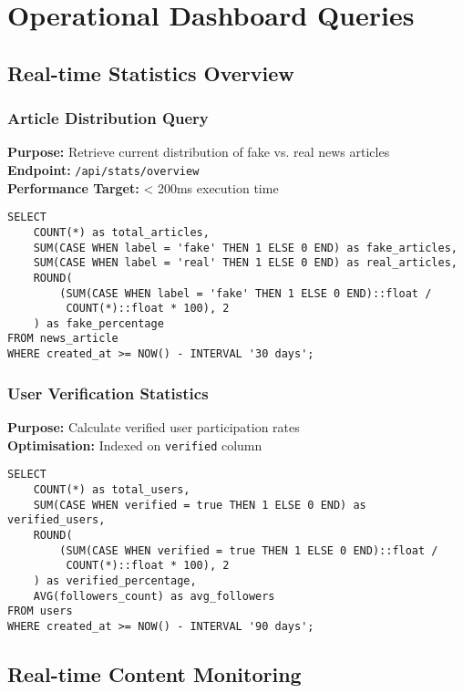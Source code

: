 \documentclass[11pt,a4paper]{article}
\begin{document}
\section{Operational Dashboard Queries}

\subsection{Real-time Statistics Overview}

\subsubsection{Article Distribution Query}
\textbf{Purpose:} Retrieve current distribution of fake vs. real news articles\\
\textbf{Endpoint:} \texttt{/api/stats/overview}\\
\textbf{Performance Target:} < 200ms execution time

\begin{verbatim}
SELECT 
    COUNT(*) as total_articles,
    SUM(CASE WHEN label = 'fake' THEN 1 ELSE 0 END) as fake_articles,
    SUM(CASE WHEN label = 'real' THEN 1 ELSE 0 END) as real_articles,
    ROUND(
        (SUM(CASE WHEN label = 'fake' THEN 1 ELSE 0 END)::float / 
         COUNT(*)::float * 100), 2
    ) as fake_percentage
FROM news_article
WHERE created_at >= NOW() - INTERVAL '30 days';
\end{verbatim}

\subsubsection{User Verification Statistics}
\textbf{Purpose:} Calculate verified user participation rates\\
\textbf{Optimisation:} Indexed on \texttt{verified} column

\begin{verbatim}SELECT 
    COUNT(*) as total_users,
    SUM(CASE WHEN verified = true THEN 1 ELSE 0 END) as verified_users,
    ROUND(
        (SUM(CASE WHEN verified = true THEN 1 ELSE 0 END)::float / 
         COUNT(*)::float * 100), 2
    ) as verified_percentage,
    AVG(followers_count) as avg_followers
FROM users
WHERE created_at >= NOW() - INTERVAL '90 days';
\end{verbatim}

\subsection{Real-time Content Monitoring}
\end{document}
